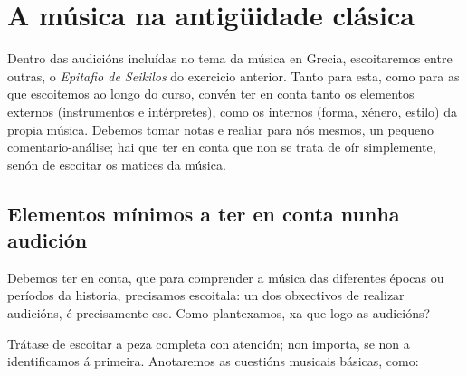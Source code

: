 %
%
\section{A música na antigüidade clásica}
%
%
Dentro das audicións incluídas no tema da música en Grecia, escoitaremos entre outras, o \textit{Epitafio de Seikilos} do exercicio anterior. 
Tanto para esta, como para as que escoitemos ao longo do curso, convén ter en conta tanto os elementos externos (instrumentos e intérpretes), como os internos (forma, xénero, estilo) da propia música. 
Debemos tomar notas e realiar para nós mesmos, un pequeno comentario-análise; hai que ter en conta que non se trata de oír simplemente, senón de escoitar os matices da música.
%
\subsection*{Elementos mínimos a ter en conta nunha audición}
%
%
Debemos ter en conta, que para comprender a música das diferentes épocas ou períodos da historia, precisamos escoitala: un dos obxectivos de realizar audicións, é precisamente ese. 
Como plantexamos, xa que logo as audicións?
\par
Trátase de escoitar a peza completa con atención; non importa, se non a identificamos á primeira. Anotaremos as cuestións musicais básicas, como:
%
%
